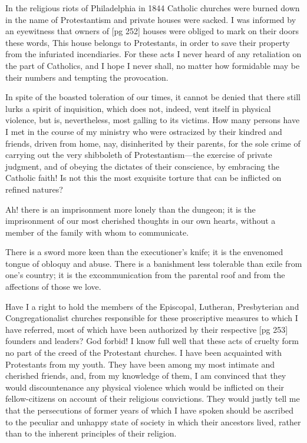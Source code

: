 In the religious riots of Philadelphia in 1844
Catholic churches were burned down in the name
of Protestantism and private houses were sacked.
I was informed by an eyewitness that owners of
[pg 252]
houses were obliged to mark on their doors these
words, This house belongs to Protestants, in order
to save their property from the infuriated incendiaries.
For these acts I never heard of any retaliation
on the part of Catholics, and I hope I
never shall, no matter how formidable may be
their numbers and tempting the provocation.

In spite of the boasted toleration of our times,
it cannot be denied that there still lurks a spirit
of inquisition, which does not, indeed, vent itself
in physical violence, but is, nevertheless, most
galling to its victims. How many persons have
I met in the course of my ministry who were ostracized
by their kindred and friends, driven from
home, nay, disinherited by their parents, for the
sole crime of carrying out the very shibboleth of
Protestantism—the exercise of private judgment,
and of obeying the dictates of their conscience, by
embracing the Catholic faith! Is not this the most
exquisite torture that can be inflicted on refined
natures?

Ah! there is an imprisonment more lonely than
the dungeon; it is the imprisonment of our most
cherished thoughts in our own hearts, without a
member of the family with whom to communicate.

There is a sword more keen than the executioner's
knife; it is the envenomed tongue of obloquy
and abuse. There is a banishment less tolerable
than exile from one's country; it is the excommunication
from the parental roof and from the
affections of those we love.

Have I a right to hold the members of the
Episcopal, Lutheran, Presbyterian and Congregationalist
churches responsible for these proscriptive
measures to which I have referred, most of
which have been authorized by their respective
[pg 253]
founders and leaders? God forbid! I know full
well that these acts of cruelty form no part of
the creed of the Protestant churches. I have been
acquainted with Protestants from my youth. They
have been among my most intimate and cherished
friends, and, from my knowledge of them, I am
convinced that they would discountenance any
physical violence which would be inflicted on their
fellow-citizens on account of their religious convictions.
They would justly tell me that the persecutions
of former years of which I have spoken
should be ascribed to the peculiar and unhappy
state of society in which their ancestors lived,
rather than to the inherent principles of their religion.

